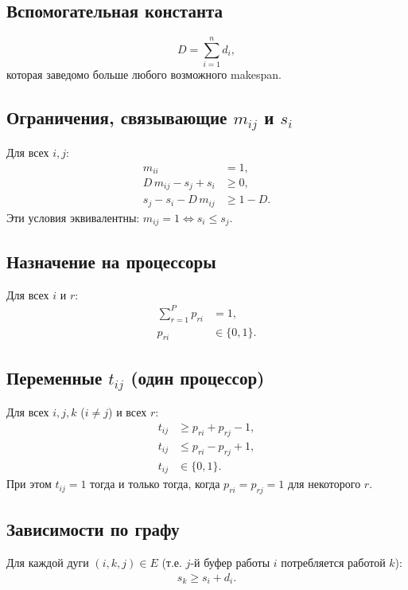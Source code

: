 \subsection*{Вспомогательная константа}

\[
D = \sum_{i=1}^{n} d_i,
\]
которая заведомо больше любого возможного makespan.

\subsection*{Ограничения, связывающие $m_{ij}$ и $s_i$}

Для всех $i,j$:
\begin{align}
	m_{ii} &= 1, \label{eq:m_diag}\\
	D\,m_{ij} - s_j + s_i &\ge 0, \label{eq:m_ge}\\
	s_j - s_i - D\,m_{ij} &\ge 1 - D. \label{eq:m_le}
\end{align}
Эти условия эквивалентны: $m_{ij}=1 \Leftrightarrow s_i \le s_j$.

\subsection*{Назначение на процессоры}

Для всех $i$ и $r$:
\begin{align}
	\sum_{r=1}^{P} p_{ri} &= 1, \label{eq:p_sum}\\
	p_{ri} &\in \{0,1\}. \nonumber
\end{align}

\subsection*{Переменные $t_{ij}$ (один процессор)}

Для всех $i,j,k$ ($i\neq j$) и всех $r$:
\begin{align}
	t_{ij} &\ge p_{ri} + p_{rj} - 1, \label{eq:t_ge}\\
	t_{ij} &\le p_{ri} - p_{rj} + 1, \label{eq:t_le}\\
	t_{ij} &\in \{0,1\}. \nonumber
\end{align}
При этом $t_{ij}=1$ тогда и только тогда, когда $p_{ri}=p_{rj}=1$ для некоторого $r$.

\subsection*{Зависимости по графу}

Для каждой дуги $(i,k,j)\in E$ (т.е. $j$-й буфер работы $i$ потребляется работой $k$):
\begin{align}
	s_k \ge s_i + d_i. \label{eq:prec}
\end{align}

